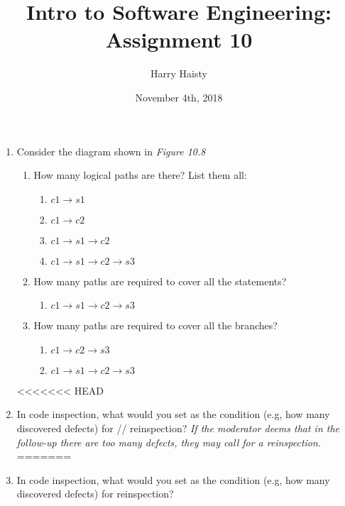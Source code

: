 \documentclass[11pt]{article}
\date{November 4th, 2018}
\title{Intro to Software Engineering: Assignment 10}
\author{Harry Haisty}
\begin{document}
    \maketitle
    \begin{enumerate}
        \item Consider the diagram shown in \textit{Figure 10.8}
        \begin{enumerate}
        \item How many logical paths are there? List them all:
        \begin{enumerate}
            \item $c1 \rightarrow s1$
            \item $c1 \rightarrow c2$
            \item $c1 \rightarrow s1 \rightarrow c2$
            \item $c1 \rightarrow s1 \rightarrow c2 \rightarrow s3$
        \end{enumerate}
        
        \item How many paths are required to cover all the statements?
        \begin{enumerate}
            \item $c1 \rightarrow s1 \rightarrow c2 \rightarrow s3$
        \end{enumerate}
        
        \item How many paths are required to cover all the branches?
        \begin{enumerate}
            \item $c1 \rightarrow c2 \rightarrow s3$
            \item $c1 \rightarrow s1 \rightarrow c2 \rightarrow s3$
        \end{enumerate}
        
        \end{enumerate}
        
<<<<<<< HEAD
        \item In code inspection, what would you set as the condition (e.g, how many discovered defects) for // reinspection?
        \newline 
       \textit{If the moderator deems that in the follow-up there are too many defects, they may call for a reinspection.}
=======
        \item In code inspection, what would you set as the condition (e.g, how many discovered defects) for reinspection?
        \newline
        \color{blue}{If the moderator deems that in the follow-up there are too many defects, they may call for a reinspection.}
        

\end{enumerate}
\end{document}
